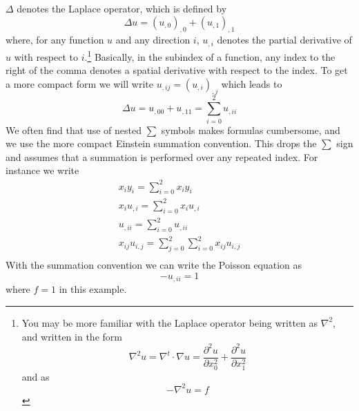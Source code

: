 $\Delta$ denotes the Laplace operator, which is defined by
\begin{equation}
\Delta u = (u_{,0})_{,0}+(u_{,1})_{,1}
\label{eq:FirstSteps.1.1}
\end{equation}
where, for any function $u$ and any direction $i$, $u_{,i}$
denotes the partial derivative  of $u$ with respect
to $i$.\footnote{You may be more familiar with the Laplace
operator being written as $\nabla^2$, and written in
the form
\begin{equation*}
    \nabla^2 u = \nabla^t \cdot \nabla u =  \frac{\partial^2 u}{\partial x_0^2} 
    + \frac{\partial^2 u}{\partial  x_1^2}
\end{equation*}
and  as
\begin{equation*}
    -\nabla^2 u = f
\end{equation*}
}
Basically, in the subindex of a function, any index to the right of the comma denotes a spatial derivative with respect 
to the index. To get a more compact form we will write $u_{,ij}=(u_{,i})_{,j}$
which leads to
\begin{equation}
\Delta u = u_{,00}+u_{,11}=\sum_{i=0}^2 u_{,ii}
\label{eq:FirstSteps.1.1b}
\end{equation}
We often find that use
of nested $\sum$ symbols makes formulas cumbersome, and we use the more
compact Einstein summation convention. This 
drops the $\sum$ sign and assumes that a summation is performed over any repeated index.
For instance we write
\begin{eqnarray}
x_{i}y_{i}=\sum_{i=0}^2 x_{i}y_{i}   \\
x_{i}u_{,i}=\sum_{i=0}^2 x_{i}u_{,i}   \\
u_{,ii}=\sum_{i=0}^2 u_{,ii} \\
x_{ij}u_{i,j}=\sum_{j=0}^2\sum_{i=0}^2 x_{ij}u_{i,j}   \\
\label{eq:FirstSteps.1.1c}
\end{eqnarray}
With the summation convention we can write the Poisson equation  as
\begin{equation}
- u_{,ii} =1 
\label{eq:FirstSteps.1.sum}
\end{equation}
where $f=1$ in this example.

